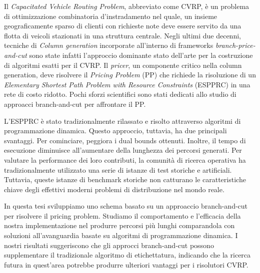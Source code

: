 \noindent Il \textit{Capacitated Vehicle Routing Problem}, abbreviato come CVRP,
è un problema di ottimizzazione combinatoria d'instradamento nel quale,
un insieme geograficamente sparso di clienti con richieste note
deve essere servito da una flotta di veicoli stazionati in una struttura centrale.
Negli ultimi due decenni,
tecniche di \textit{Column generation} incorporate all'interno di frameworks \textit{branch-price-and-cut}
sono state infatti l'approccio dominante stato dell'arte per la costruzione di algoritmi esatti per il CVRP.
Il \textit{pricer}, un componente critico nella column generation, deve risolvere
il \textit{Pricing Problem} (PP) che richiede la risoluzione di un
\textit{Elementary Shortest Path Problem with Resource Constraints} (ESPPRC)
in una rete di costo ridotto.
Pochi sforzi scientifici sono stati dedicati allo studio di approacci
branch-and-cut per affrontare il PP.

L'ESPPRC è stato tradizionalmente rilassato e risolto attraverso algoritmi di programmazione dinamica.
Questo approccio, tuttavia, ha due principali svantaggi.
Per cominciare, peggiora i dual bounds ottenuti.
Inoltre, il tempo di esecuzione diminuisce all'aumentare della lunghezza dei percorsi generati.
Per valutare la performance dei loro contributi,
la comunità di ricerca operativa ha tradizionalmente utilizzato una serie di istanze
di test storiche e artificiali.
Tuttavia, queste istanze di benchmark storiche non catturano le caratteristiche chiave degli effettivi moderni problemi di distribuzione nel mondo reale.

\noindent In questa tesi sviluppiamo
uno schema basato su un approaccio branch-and-cut per risolvere il pricing problem.
Studiamo il comportamento e l'efficacia della nostra implementazione nel produrre percorsi più lunghi
comparandola con soluzioni all'avanguardia basate su algoritmi di programmazione dinamica.
I nostri risultati suggeriscono che gli approcci branch-and-cut possono supplementare il tradizionale algoritmo di etichettatura, indicando che la ricerca futura in quest'area potrebbe produrre ulteriori vantaggi per i risolutori CVRP.
